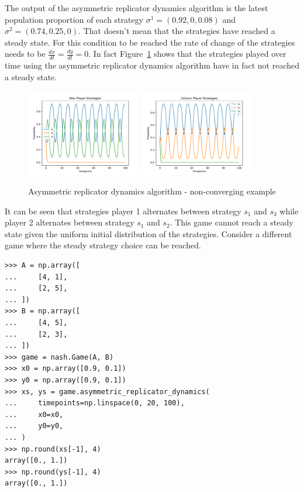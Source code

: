 The output of the asymmetric replicator dynamics algorithm is the latest
population proportion of each strategy \(\sigma^1 = (0.92, 0, 0.08)\) and
\(\sigma^2 = (0.74, 0.25, 0)\).
That doesn't mean that the strategies have reached a steady state.
For this condition to be reached the rate of change of the strategies needs to
be \(\frac{dx}{dt} = \frac{dy}{dt} = 0\).
In fact Figure~\ref{fig:asymmetric_replicator_dynamics} shows that the
strategies played over time using the asymmetric replicator dynamics algorithm
have in fact not reached a steady state.

\begin{figure}[H]
    \centering
    \includegraphics[width=0.45\textwidth]{chapters/04_game_theoretic_model/img/learning_algorithms_example/asymmetric_rd_row.pdf}
    \includegraphics[width=0.45\textwidth]{chapters/04_game_theoretic_model/img/learning_algorithms_example/asymmetric_rd_col.pdf}
    \caption{Asymmetric replicator dynamics algorithm - non-converging example}
    \label{fig:asymmetric_replicator_dynamics}
\end{figure}

It can be seen that strategies player 1 alternates between strategy \(s_1\) and
\(s_3\) while player 2 alternates between strategy \(s_1\) and \(s_2\).
This game cannot reach a steady state given the uniform initial distribution of
the strategies.
Consider a different game where the steady strategy choice can be reached.

\begin{lstlisting}[style=pystyle]
>>> A = np.array([
...     [4, 1],
...     [2, 5],
... ])
>>> B = np.array([
...     [4, 5],
...     [2, 3],
... ])
>>> game = nash.Game(A, B)
>>> x0 = np.array([0.9, 0.1])
>>> y0 = np.array([0.9, 0.1])
>>> xs, ys = game.asymmetric_replicator_dynamics(
...     timepoints=np.linspace(0, 20, 100),
...     x0=x0,
...     y0=y0,
... )
>>> np.round(xs[-1], 4)
array([0., 1.])
>>> np.round(ys[-1], 4)
array([0., 1.])

\end{lstlisting}

